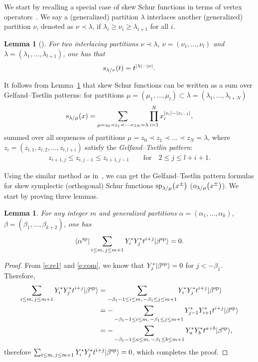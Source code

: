 \documentclass[pdftex]{sigma}
\numberwithin{equation}{section}
\newtheorem{Lemma}[Theorem]{Lemma}
\begin{document}
We start by recalling a special case of skew Schur functions in terms of vertex operators~\mbox{\cite[Proposition~2.4]{JL2020}}. We say a (generalized) partition
$\lambda$ interlaces another (generalized) partition $\nu$, denoted as $\nu\prec\lambda$, if $\lambda_{i}\ge\nu_{i}\geq\lambda_{i+1}$ for all $i$.
\begin{Lemma}[{\cite[p.~72]{Mac1995}}]\label{le3} For two interlacing partitions $\nu\prec\lambda$, $\nu=(\nu_{1},\dots,\nu_{l})$ and $\lambda=(\lambda_{1},\dots,\lambda_{l+1})$, one has that
\begin{align*}
{\rm s}_{\lambda/\nu}(t)=t^{|\lambda|-|\nu|}.
\end{align*}
\end{Lemma}
It follows from Lemma~\ref{le3} that skew Schur functions can be written as a sum over Gelfand--Tsetlin patterns: for partitions $\mu=(\mu_1,\dots,\mu_l)\subset \lambda=(\lambda_1,\dots,\lambda_{l+N})$
\begin{align*}
{\rm s}_{\lambda/\mu}(x)=\sum_{\mu=z_0\prec z_1\prec\dots\prec z_N=\lambda}\prod^N_{i=1}x^{|z_i|-|z_{i-1}|}_i,
\end{align*}
summed over all sequences of partitions $\mu=z_0\prec z_1\prec\dots\prec z_N=\lambda$, where
$z_i=(z_{i,1},z_{i,2},\dots,\allowbreak z_{i,l+i})$ satisfy
 the {\it Gelfand--Tsetlin pattern}:
\begin{align*}
z_{i+1,j}\leq z_{i,j-1}\leq z_{i+1,j-1}\qquad \text{for}\quad 2\leq j\leq l+i+1.
\end{align*}

Using the similar method as in~\cite{JL2020}, we can get the Gelfand--Tsetlin pattern formulas for skew symplectic (orthogonal) Schur functions ${\rm sp}_{\lambda/\mu}\big(x^{\pm}\big)$ \big(${\rm o}_{\lambda/\mu}\big(x^{\pm}\big)$\big). We start by proving three lemmas.
\begin{Lemma}For any integer $m$ and generalized partitions $\alpha=(\alpha_1,\dots,\alpha_k)$, $\beta=(\beta_1,\dots,\beta_{k+2})$, one has
\begin{align*}
\langle\alpha^{\rm sp}|\sum_{i\leq m,\, j\leq m+1}Y^*_{i}Y^*_{j}t^{i+j}|\beta^{\rm sp}\rangle=0.
\end{align*}
\end{Lemma}
\begin{proof}
From \eqref{e:re1} and \eqref{e:com}, we know that $Y^*_{j}|\beta^{\rm sp}\rangle=0$ for $j<-\beta_1$. Therefore,
\begin{align*}
\sum_{i\leq m,\, j\leq m+1}Y^*_{i}Y^*_{j}t^{i+j}|\beta^{\rm sp}\rangle
&=\sum_{-\beta_1-1\leq i\leq m,\, -\beta_1\leq j\leq m+1}Y^*_{i}Y^*_{j}t^{i+j}|\beta^{\rm sp}\rangle\\
&=-\sum_{-\beta_1-1\leq i\leq m,\, -\beta_1\leq j\leq m+1}Y^*_{j-1}Y^*_{i+1}t^{i+j}|\beta^{\rm sp}\rangle\\
&=-\sum_{-\beta_1-1\leq a\leq m,\, -\beta_1\leq b\leq m+1}Y^*_{a}Y^*_{b}t^{a+b}|\beta^{\rm sp}\rangle,
\end{align*}
therefore $\sum_{i\leq m,\, j\leq m+1}Y^*_{i}Y^*_{j}t^{i+j}|\beta^{\rm sp}\rangle=0$, which completes the proof.
\end{proof}
\end{document}
